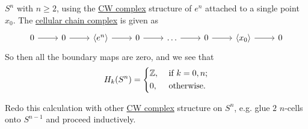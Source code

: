 \begin{eg}
	\(S^n\) with \(n \geq 2\), using the \hyperref[def:CW-Complex]{CW complex} structure of \(e^n\) attached to a single point \(x_0\). The \hyperref[def:cellular-chain-complex]{cellular chain complex} is given as
	\[
		\begin{tikzcd}
			0 & 0 & {\left<e^n\right>} & 0 & \ldots & 0 & {\left<x_0\right>} & 0
			\arrow[from=1-1, to=1-2]
			\arrow[from=1-2, to=1-3]
			\arrow[from=1-3, to=1-4]
			\arrow[from=1-4, to=1-5]
			\arrow[from=1-5, to=1-6]
			\arrow[from=1-6, to=1-7]
			\arrow[from=1-7, to=1-8]
		\end{tikzcd}
	\]
	So then all the boundary maps are zero, and we see that
	\[
		H_k(S^n) = \begin{dcases}
			\mathbb{\MakeUppercase{z}}, & \text{ if } k=0, n ; \\
			0,                          & \text{ otherwise}.
		\end{dcases}
	\]
\end{eg}

\begin{exercise}
	Redo this calculation with other \hyperref[def:CW-Complex]{CW complex} structure on \(S^n\), e.g. glue \(2\) \(n\)-cells onto \(S^{n - 1}\) and proceed inductively.
\end{exercise}